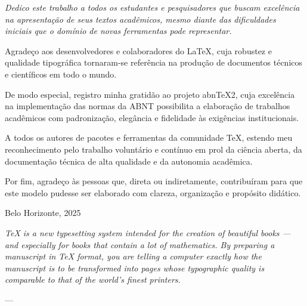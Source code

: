 
\frenchspacing
\pretextual
\imprimircapa
\imprimirfolhaderosto*




\begin{dedicatoria}
    \vspace*{\fill}

    \centering
    \textit{Dedico este trabalho a todos os estudantes e pesquisadores que buscam excelência na apresentação de seus textos acadêmicos, mesmo diante das dificuldades iniciais que o domínio de novas ferramentas pode representar.}%

    \vspace*{\fill}
\end{dedicatoria}


\begin{agradecimentos}
    Agradeço aos desenvolvedores e colaboradores do \LaTeX{}, cuja robustez e qualidade tipográfica tornaram-se referência na produção de documentos técnicos e científicos em todo o mundo.

    De modo especial, registro minha gratidão ao projeto abn\TeX 2, cuja excelência na implementação das normas da ABNT possibilita a elaboração de trabalhos acadêmicos com padronização, elegância e fidelidade às exigências institucionais.

    A todos os autores de pacotes e ferramentas da comunidade \TeX{}, estendo meu reconhecimento pelo trabalho voluntário e contínuo em prol da ciência aberta, da documentação técnica de alta qualidade e da autonomia acadêmica.

    Por fim, agradeço às pessoas que, direta ou indiretamente, contribuíram para que este modelo pudesse ser elaborado com clareza, organização e propósito didático.

    \begin{flushright}
    Belo Horizonte, 2025
    \end{flushright}
\end{agradecimentos}

\begin{epigrafe}
    \vspace*{\fill}
    \begin{flushright}
        \textit{\TeX{} is a new typesetting system intended for the creation of beautiful books --- and especially for books that contain a lot of mathematics. By preparing a manuscript in \TeX{} format, you are telling a computer exactly how the manuscript is to be transformed into pages whose typographic quality is comparable to that of the world's finest printers.}

        --- \textcite{Knuth1984}
    \end{flushright}
\end{epigrafe}

